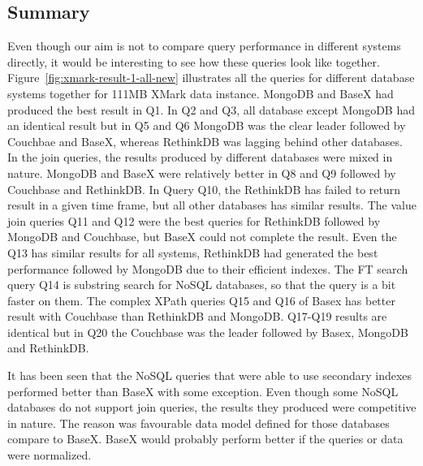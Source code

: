 \subsection{Summary}
Even though our aim is not to compare query performance in different systems directly, it would be interesting to see how these queries look like together. Figure~\ref{fig:xmark-result-1-all-new} illustrates all the queries for different database systems together for 111MB XMark data instance. MongoDB and BaseX had produced the best result in Q1. In Q2 and Q3, all database except MongoDB  had an identical result but in Q5 and Q6 MongoDB was the clear leader followed by Couchbae and BaseX, whereas RethinkDB was lagging behind other databases. In the join queries, the results produced by different databases were mixed in nature. MongoDB and BaseX were relatively better in Q8 and Q9 followed by Couchbase and RethinkDB. In Query Q10, the RethinkDB has failed to return result in a given time frame, but all other databases has similar results. The value join queries Q11 and Q12 were the best queries for RethinkDB followed by MongoDB and Couchbase, but BaseX could not complete the result. Even the Q13 has similar results for all systems, RethinkDB had generated the best performance followed by MongoDB due to their efficient indexes. The FT search query Q14 is substring search for NoSQL databases, so that the query is a bit faster on them. The complex XPath queries Q15 and Q16 of Basex has better result with Couchbase than RethinkDB and MongoDB.
Q17-Q19 results are identical but in Q20 the Couchbase was the leader followed by Basex, MongoDB and RethinkDB. 
\par
It has been seen that the NoSQL queries that were able to use secondary indexes performed better than BaseX with some exception. Even though some NoSQL databases do not support join queries, the results they produced were competitive in nature. The reason was favourable data model defined for those databases compare to BaseX. BaseX would probably perform better if the queries or data were normalized.

